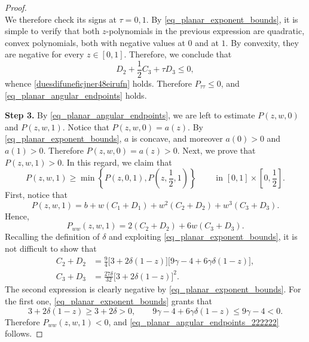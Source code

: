\documentclass[11pt]{amsart}
\renewcommand{\leq}{\leqslant}
\renewcommand{\geq}{\geqslant}
\renewcommand{\ge}{>}
\theoremstyle{definition}
\theoremstyle{remark}
\numberwithin{equation}{section}
\begin{document}
\begin{proof}
\[\]
We therefore check its signs at \(\tau=0,1\).
By \eqref{eq_planar_exponent_bounds}, it is simple to verify that both $z$-polynomials in the previous expression are quadratic, convex polynomials, both with negative values at $0$ and at $1$. By convexity, they are negative for every $z\in[0,1]$. Therefore,  we conclude that 
\[
D_2+\frac12C_3+\tau D_3
\leq 0,
\]
whence \eqref{duesdifuneficjner48eirufn} holds.
Therefore $P_{\tau\tau}\leq 0$, and 
\eqref{eq_planar_angular_endpoints} holds.

\smallskip
\noindent\textbf{Step 3.} By \eqref{eq_planar_angular_endpoints}, we are left to estimate $P(z,w,0)$ and $P(z,w,1)$. Notice that $P(z,w,0)=a(z)$. By \eqref{eq_planar_exponent_bounds}, $a$ is concave, and moreover $a(0)\ge 0$ and $a(1)\ge 0$. Therefore $P(z,w,0)=a(z)\ge 0$. Next, we prove that $P(z,w,1)\ge 0$. In this regard, we claim that 
\begin{equation}\label{eq_planar_angular_endpoints_222222}
    P(z,w,1)\geq\min\left\{P(z,0,1),P\left(z,\frac{1}{2},1\right)\right\}\qquad\text{ in }[0,1]\times\left[0,\frac{1}{2}\right].
\end{equation}
First, notice that 
\begin{equation*}
 P(z,w,1)= b
       +w( C_1+D_1)+w^2(C_2+D_2)
       +w^3(C_3+D_3).
\end{equation*}
Hence,
\[
P_{ww}(z,w,1)=2(C_2+D_2)+6w(C_3+D_3).
\]
Recalling the definition of $\delta$ and exploiting \eqref{eq_planar_exponent_bounds},
it is not difficult to show that
\[
\begin{aligned}
C_2+D_2
&=\frac94\big[3+2\delta(1-z)\big]
  \big[9\gamma-4+6\gamma\delta(1-z)\big],\\
C_3+D_3
&=\frac{27\delta}{32}\big[3+2\delta(1-z)\big]^2.
\end{aligned}
\]
The second expression is clearly negative by \eqref{eq_planar_exponent_bounds}. For the first one, 
\eqref{eq_planar_exponent_bounds} grants that 
\[
3+2\delta(1-z)\geq3+2\delta>0,
\qquad
9\gamma-4+6\gamma\delta(1-z)\leq9\gamma-4<0.
\]
Therefore \(P_{ww}(z,w,1)<0\), and 
\eqref{eq_planar_angular_endpoints_222222} follows.


\end{proof}
\end{document}

